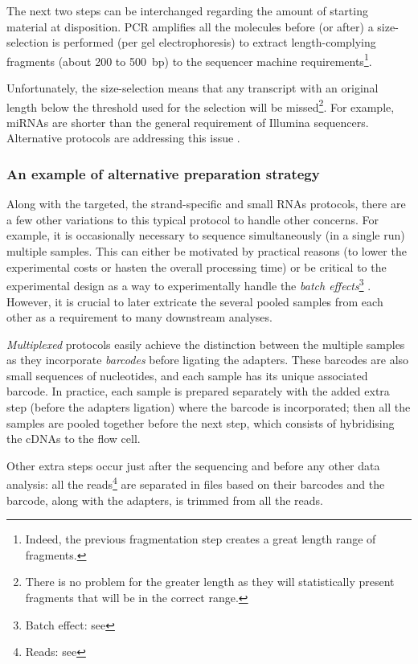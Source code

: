 The next two steps can be interchanged regarding the amount of starting material
at disposition. \gls{PCR} amplifies all the molecules before (or after)
a size-selection is performed (per gel electrophoresis) to extract
length-complying fragments (about 200 to 500\ bp) to the sequencer machine
requirements\footnote{Indeed, the previous fragmentation step creates a great
length range of fragments.}.

Unfortunately, the size-selection means that any
transcript with an original length below the threshold used for the
selection will be missed\footnote{There is no problem for the greater length
as they will statistically present fragments that will be in the correct range.}.
For example, \glspl{miRNA} are shorter than the general requirement of Illumina
sequencers. Alternative protocols are addressing this issue
.

\subsubsection{An example of alternative preparation strategy}
Along with the targeted, the strand-specific and small \glspl{RNA} protocols,
there are a few other variations to this typical protocol to handle other concerns.
For example, it is occasionally necessary to sequence simultaneously (in a single
run) multiple samples. This can either be motivated by practical reasons
(to lower the experimental costs or hasten the overall processing time)
 or be critical to the experimental design as a way to
experimentally handle the \emph{batch effects}\footnote{Batch effect: see
} . However, it is
crucial to later extricate the several pooled samples from each other as a
requirement to many downstream analyses.

\emph{Multiplexed} protocols easily achieve
the distinction between the multiple samples as they incorporate \emph{barcodes}
before ligating the adapters. These barcodes are also small sequences of
nucleotides, and each sample has its unique associated
barcode. In practice, each sample is prepared separately with the added extra
step (before the adapters ligation) where the barcode is incorporated; then all
the samples are pooled together before the next step, which consists of hybridising
the \glspl{cDNA} to the flow cell.

Other extra steps occur just after the sequencing and before any other data
analysis: all the reads\footnote{Reads: see } are
separated in files based on their barcodes and the barcode, along with the
adapters, is trimmed from all the reads.

